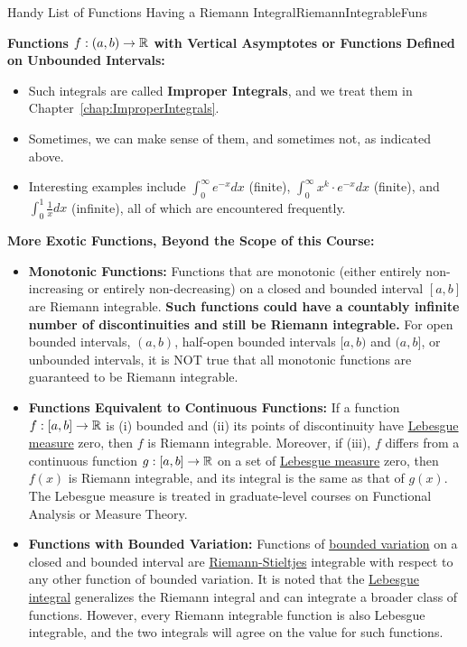 \begin{propColor}{Handy List of Functions Having a Riemann Integral}{RiemannIntegrableFuns}
\begin{itemize}
\end{itemize}

\bigskip

\textbf{Functions $f:(a, b) \to \mathbb R$ with Vertical Asymptotes or Functions Defined on Unbounded Intervals:}
\begin{itemize}
\item Such integrals are called \textbf{Improper Integrals}, and we treat them in Chapter~\ref{chap:ImproperIntegrals}.
\item Sometimes, we can make sense of them, and sometimes not, as indicated above. 
\item Interesting examples include $\int_0^\infty e^{-x} dx$ (finite), $\int_0^\infty x^k \cdot  e^{-x} dx$ (finite), and $\int_0^1 \frac{1}{x} dx$ (infinite), all of which are encountered frequently. 
\end{itemize}

\bigskip

\textbf{More Exotic Functions, Beyond the Scope of this Course:}
\begin{itemize}
\item \textbf{Monotonic Functions:} Functions that are monotonic (either entirely non-increasing or entirely non-decreasing) on a closed and bounded interval $[a, b]$ are Riemann integrable. \textbf{Such functions could have a countably infinite number of discontinuities and still be Riemann integrable.} For open bounded intervals, $(a, b)$, half-open bounded intervals $[a, b)$ and $(a, b]$, or unbounded intervals, it is NOT true that all monotonic functions are guaranteed to be Riemann integrable. 

\item  \textbf{Functions Equivalent to Continuous Functions:} If a function $f:[a, b] \to \mathbb R$ is (i) bounded and (ii) its points of discontinuity have \href{https://en.wikipedia.org/wiki/Lebesgue_measure}{Lebesgue measure} zero, then $f$ is Riemann integrable. Moreover, if (iii), $f$ differs from a continuous function $g: [a, b] \to \mathbb R$ on a set of \href{https://en.wikipedia.org/wiki/Lebesgue_measure}{Lebesgue measure} zero, then $f(x)$ is Riemann integrable, and its integral is the same as that of $g(x)$. The Lebesgue measure is treated in graduate-level courses on Functional Analysis or Measure Theory.

\item \textbf{Functions with Bounded Variation:} Functions of \href{https://en.wikipedia.org/wiki/Bounded_variation}{bounded variation} on a closed and bounded interval are \href{https://en.wikipedia.org/wiki/Riemann%E2%80%93Stieltjes_integral}{Riemann-Stieltjes} integrable with respect to any other function of bounded variation. It is noted that the \href{https://en.wikipedia.org/wiki/Lebesgue_integration}{Lebesgue integral} generalizes the Riemann integral and can integrate a broader class of functions. However, every Riemann integrable function is also Lebesgue integrable, and the two integrals will agree on the value for such functions.
\end{itemize}





\end{propColor}
